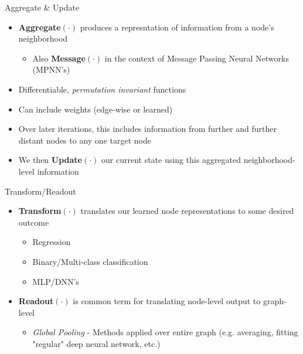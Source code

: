 \documentclass{beamer}
\begin{document}
\begin{frame}{Aggregate \& Update}
    \begin{itemize}
        \item {\bf Aggregate$(\cdot)$} produces a represntation of information from a node's neighborhood 
        \begin{itemize}
            \item Also {\bf Message$(\cdot)$} in the context of Message Passing Neural Networks (MPNN's) \cite{gilmer_neural_2017}
        \end{itemize}
        \item Differentiable, {\it permutation invariant} functions 
        \item Can include weights (edge-wise or learned)
        \item Over later iterations, this includes information from further and further distant nodes to any one target node 
    \end{itemize}

    \vspace{4mm}

    \begin{itemize}
        \item We then {\bf Update$(\cdot)$} our current state using this aggregated neighborhood-level information
    \end{itemize}
\end{frame}


\begin{frame}{Transform/Readout}
    \begin{itemize}
        \item {\bf Transform$(\cdot)$ } translates our learned node representations to some desired outcome 
        \begin{itemize}
            \item Regression
            \item Binary/Multi-class classification 
            \item MLP/DNN's 
        \end{itemize}
        \item {\bf Readout$(\cdot)$} is common term for translating node-level output to graph-level
        \begin{itemize}
            \item {\it Global Pooling} - Methods applied over entire graph (e.g. averaging, fitting "regular" deep neural network, etc.)
        \end{itemize}
    \end{itemize}
\end{frame}
\end{document}
